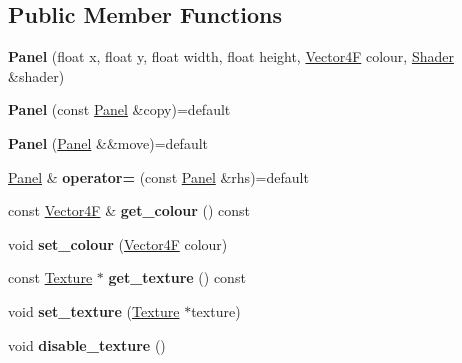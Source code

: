 \subsection*{Public Member Functions}
\begin{DoxyCompactItemize}
\item 
\mbox{\label{class_panel_aafa4aa5f39fb3f832e2f1585ecbce0e9}} 
{\bfseries Panel} (float x, float y, float width, float height, \mbox{\hyperlink{class_vector4}{Vector4F}} colour, \mbox{\hyperlink{class_shader}{Shader}} \&shader)
\item 
\mbox{\label{class_panel_a84ba0db4d814ef07d1ee0fb23b616936}} 
{\bfseries Panel} (const \mbox{\hyperlink{class_panel}{Panel}} \&copy)=default
\item 
\mbox{\label{class_panel_a94a994d69720e94a80e20a1a49acf073}} 
{\bfseries Panel} (\mbox{\hyperlink{class_panel}{Panel}} \&\&move)=default
\item 
\mbox{\label{class_panel_a1280c41ee69aaf8ce9c36c10f691bbda}} 
\mbox{\hyperlink{class_panel}{Panel}} \& {\bfseries operator=} (const \mbox{\hyperlink{class_panel}{Panel}} \&rhs)=default
\item 
\mbox{\label{class_panel_ace1342ef6e7c0f73a44e380356ce5e28}} 
const \mbox{\hyperlink{class_vector4}{Vector4F}} \& {\bfseries get\+\_\+colour} () const
\item 
\mbox{\label{class_panel_af23b45cbf03066f1a1d884486ca00712}} 
void {\bfseries set\+\_\+colour} (\mbox{\hyperlink{class_vector4}{Vector4F}} colour)
\item 
\mbox{\label{class_panel_a938f8a6b4038c5ebd43468ff7c6279c6}} 
const \mbox{\hyperlink{class_texture}{Texture}} $\ast$ {\bfseries get\+\_\+texture} () const
\item 
\mbox{\label{class_panel_aecd67bfb730ba8e0afd331b5c25c0e83}} 
void {\bfseries set\+\_\+texture} (\mbox{\hyperlink{class_texture}{Texture}} $\ast$texture)
\item 
\mbox{\label{class_panel_a126b9ac55e35e3530f01614f285e0eea}} 
void {\bfseries disable\+\_\+texture} ()

\end{DoxyCompactItemize}
